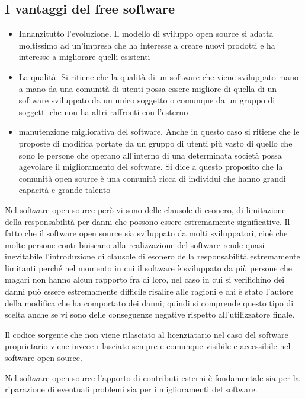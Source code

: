 \subsection{I vantaggi del free software}
\begin{itemize}
    \item Innanzitutto l'evoluzione. Il modello di sviluppo open source si adatta moltissimo ad un'impresa che ha interesse a creare nuovi prodotti e ha interesse a migliorare quelli esistenti
    \item La qualità. Si ritiene che la qualità di un software che viene sviluppato mano a mano da una comunità di utenti possa essere migliore di quella di un software sviluppato da un unico soggetto o comunque da un gruppo di soggetti che non ha altri raffronti con l'esterno
    \item manutenzione migliorativa del software. Anche in questo caso si ritiene che le proposte di modifica portate da un gruppo di utenti più vasto di quello che sono le persone che operano all'interno di una determinata società possa agevolare il miglioramento del software. Si dice a questo proposito che la comunità open source è una comunità ricca di individui che hanno grandi capacità e grande talento
\end{itemize}



Nel software open source però vi sono delle clausole di esonero, di limitazione della responsabilità per danni che possono essere estremamente significative. Il fatto che il software open source sia sviluppato da molti sviluppatori, cioè che molte persone contribuiscano alla realizzazione del software rende quasi inevitabile l'introduzione di clausole di esonero della responsabilità estremamente limitanti perché nel momento in cui il software è sviluppato da più persone che magari non hanno alcun rapporto fra di loro, nel caso in cui si verifichino dei danni può essere estremamente difficile risalire alle ragioni e chi è stato l'autore della modifica che ha comportato dei danni; quindi si comprende questo tipo di scelta anche se vi sono delle conseguenze negative rispetto all'utilizzatore finale. 


Il codice sorgente che non viene rilasciato al licenziatario nel caso del software proprietario viene invece rilasciato sempre e comunque visibile e accessibile nel software open source. 

Nel software open source l'apporto di contributi esterni è fondamentale sia per la riparazione di eventuali problemi sia per i miglioramenti del software. 


